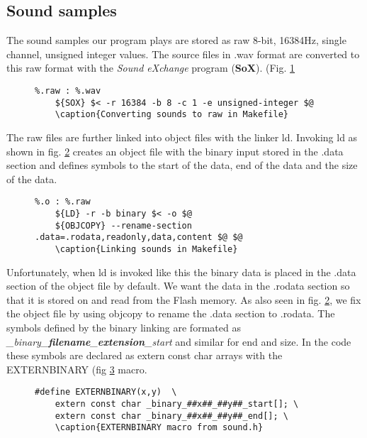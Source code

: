 \subsection{Sound samples}

The sound samples our program plays are stored as raw 8-bit, 16384Hz, single
channel, unsigned integer values. The source files in .wav format are converted
to this raw format with the \emph{Sound eXchange} program (\textbf{SoX}). (Fig.
\ref{Makefile:soundconvert}
\begin{figure}[h]
	\label{Makefile:soundconvert}
	\begin{lstlisting}
%.raw : %.wav
	${SOX} $< -r 16384 -b 8 -c 1 -e unsigned-integer $@
	\caption{Converting sounds to raw in Makefile}
	\end{lstlisting}
\end{figure}
The raw files are further linked into object files with the linker ld. Invoking
ld as shown in fig. \ref{Makefile:soundlink} creates an object file with the
binary input stored in the .data section and defines symbols to the start of the
data, end of the data and the size of the data.
\begin{figure}[h]
	\label{Makefile:soundlink}
	\begin{lstlisting}
%.o : %.raw
	${LD} -r -b binary $< -o $@
	${OBJCOPY} --rename-section .data=.rodata,readonly,data,content $@ $@
	\caption{Linking sounds in Makefile}
	\end{lstlisting}
\end{figure}
Unfortunately, when ld is invoked like this the binary data is placed in the
.data section of the object file by default. We want the data in the .rodata
section so that it is stored on and read from the Flash memory. As also seen in
fig. \ref{Makefile:soundlink}, we fix the object file by using objcopy to rename
the .data section to .rodata. The symbols defined by the binary linking are
formated as \emph{\_binary\_\textbf{filename}\_\textbf{extension}\_start} and
similar for end and size. In the code these symbols are declared as extern const
char arrays with the EXTERNBINARY (fig \ref{code:externbinary} macro.
\begin{figure}[h]
	\label{code:externbinary}
	\begin{lstlisting}
#define EXTERNBINARY(x,y)  \
	extern const char _binary_##x##_##y##_start[]; \
	extern const char _binary_##x##_##y##_end[]; \
	\caption{EXTERNBINARY macro from sound.h}
	\end{lstlisting}
\end{figure}

